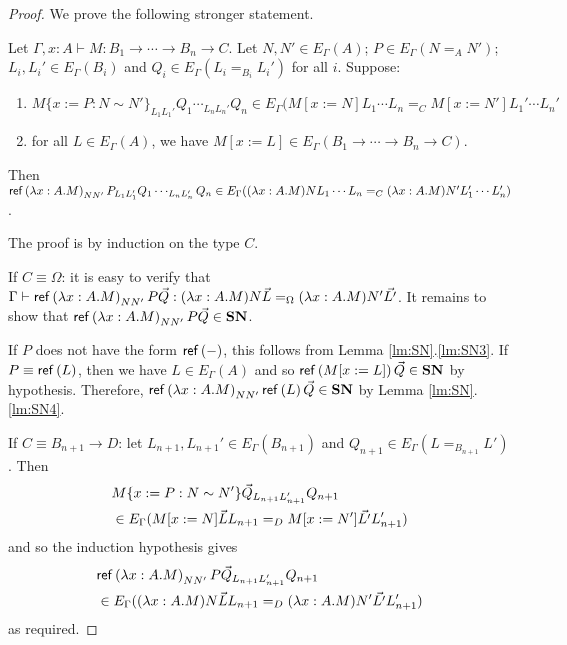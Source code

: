 \begin{proof}
We prove the following stronger statement.

Let $\Gamma, x : A \vdash M : B_1 \rightarrow \cdots \rightarrow B_n \rightarrow C$.  Let $N, N' \in E_\Gamma(A)$; $P \in E_\Gamma(N =_A N')$; $L_i, L_i' \in E_\Gamma(B_i)$ and $Q_i \in E_\Gamma(L_i =_{B_i} L_i')$ for all $i$.  Suppose:
\begin{enumerate}
\item
$M\{x:=P:N \sim N'\}_{L_1 L_1'} Q_1 \cdots_{L_n L_n'} Q_n \in E_\Gamma(M[x:=N]L_1 \cdots L_n =_C
M[x:=N']L_1'\cdots L_n'$
\item
for all $L \in E_\Gamma(A)$, we have $M[x:=L] \in E_\Gamma(B_1 \rightarrow \cdots \rightarrow B_n \rightarrow C)$.
\end{enumerate}
Then $\mathsf{ref} \left( {\lambda x:A.M} \right)_{N N'} P_{L_1 L_1'} Q_1 \cdots_{L_n L_n'} Q_n \in
E_\Gamma((\lambda x:A.M) N L_1 \cdots L_n =_C (\lambda x:A.M) N' L_1' \cdots L_n')$.

The proof is by induction on the type $C$.

If $C \equiv \Omega$: it is easy to verify that $\Gamma \vdash \mathsf{ref} \left( {\lambda x:A.M} \right)_{N N'} P \vec{Q} : (\lambda x:A.M)N \vec{L} =_\Omega (\lambda x:A.M) N' \vec{L'}$.  It remains to show that $\mathsf{ref} \left( {\lambda x:A.M} \right)_{N N'} P \vec{Q} \in \mathbf{SN}$.

If $P$ does not have the form $\mathsf{ref} \left( {-} \right)$, this follows from Lemma \ref{lm:SN}.\ref{lm:SN3}.  If $P \equiv \mathsf{ref} \left( {L} \right)$, then we have $L \in E_\Gamma(A)$ and so $\mathsf{ref} \left( {M[x:=L]} \right) \vec{Q} \in \mathbf{SN}$ by hypothesis.  Therefore, $\mathsf{ref} \left( {\lambda x:A.M} \right)_{N N'} \mathsf{ref} \left( {L} \right) \vec{Q} \in \mathbf{SN}$ by Lemma \ref{lm:SN}.\ref{lm:SN4}.

If $C \equiv B_{n+1} \rightarrow D$: let $L_{n+1}, L_{n+1}' \in E_\Gamma(B_{n+1})$ and $Q_{n+1} \in E_\Gamma(L =_{B_{n+1}} L')$.  Then
\begin{align*}
\lefteqn{M\{x:=P:N \sim N'\} \vec{Q}_{L_{n+1} L_{n+1}'} Q_{n+1}} \\
\quad & \in E_\Gamma(M[x:=N]\vec{L} L_{n+1} =_D M[x:=N'] \vec{L'} L_{n+1}')
\end{align*}
and so the induction hypothesis gives
\begin{align*}
\lefteqn{\reff{\lambda x:A.M}_{N N'} P \vec{Q}_{L_{n+1} L'_{n+1}} Q_{n+1}} \\
\quad & \in E_\Gamma((\lambda x:A.M) N \vec{L} L_{n+1} =_D (\lambda x:A.M) N' \vec{L'} L_{n+1}')
\end{align*}
as required.
\end{proof}

